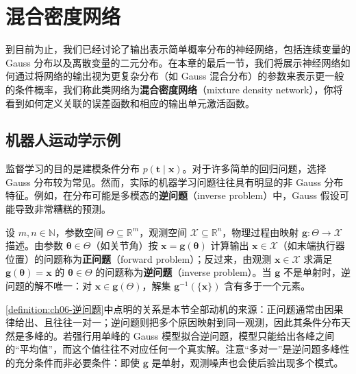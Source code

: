 \documentclass[../../main.tex]{subfiles}
\begin{document}
\section{混合密度网络}\label{section:ch06-混合密度网络}

到目前为止，我们已经讨论了输出表示简单概率分布的神经网络，包括连续变量的 Gauss 分布以及离散变量的二元分布。在本章的最后一节，我们将展示神经网络如何通过将网络的输出视为更复杂分布（如 Gauss 混合分布）的参数来表示更一般的条件概率，我们称此类网络为\textbf{混合密度网络}（mixture density network），你将看到如何定义关联的误差函数和相应的输出单元激活函数。

\subsection{机器人运动学示例}\label{subsection:ch06-机器人运动学示例}

监督学习的目的是建模条件分布 $p(\boldsymbol{t}\mid\boldsymbol{x})$。对于许多简单的回归问题，选择 Gauss 分布较为常见。然而，实际的机器学习问题往往具有明显的非 Gauss 分布特征。例如，在分布可能是多模态的\textbf{逆问题}（inverse problem）中，Gauss 假设可能导致非常糟糕的预测。

\begin{definition}[正问题与逆问题]\label{definition:ch06-逆问题}
设 $m,n\in\mathbb{N}$，参数空间 $\Theta\subseteq\mathbb{R}^{m}$，观测空间 $\mathcal{X}\subseteq\mathbb{R}^{n}$，物理过程由映射 $\boldsymbol{g}:\Theta\to\mathcal{X}$ 描述。由参数 $\boldsymbol{\theta}\in\Theta$（如关节角）按 $\boldsymbol{x}=\boldsymbol{g}(\boldsymbol{\theta})$ 计算输出 $\boldsymbol{x}\in\mathcal{X}$（如末端执行器位置）的问题称为\textbf{正问题}（forward problem）；反过来，由观测 $\boldsymbol{x}\in\mathcal{X}$ 求满足 $\boldsymbol{g}(\boldsymbol{\theta})=\boldsymbol{x}$ 的 $\boldsymbol{\theta}\in\Theta$ 的问题称为\textbf{逆问题}（inverse problem）。当 $\boldsymbol{g}$ 不是单射时，逆问题的解不唯一：对 $\boldsymbol{x}\in\boldsymbol{g}(\Theta)$，解集 $\boldsymbol{g}^{-1}(\{\boldsymbol{x}\})$ 含有多于一个元素。
\end{definition}

\begin{remark}\cref{definition:ch06-逆问题}中点明的关系是本节全部动机的来源：正问题通常由因果律给出、且往往一对一；逆问题则把多个原因映射到同一观测，因此其条件分布天然是多峰的。若强行用单峰的 Gauss 模型拟合逆问题，模型只能给出各峰之间的“平均值”，而这个值往往不对应任何一个真实解。注意“多对一”是逆问题多峰性的充分条件而非必要条件：即使 $\boldsymbol{g}$ 是单射，观测噪声也会使后验出现多个模式。
\end{remark}
\end{document}
